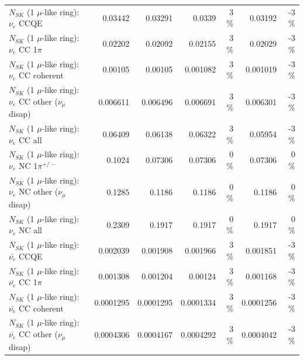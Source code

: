 \begin{table}
\begin{tabular}{| l | r | r | r  r | r  r |}
\hline
\hline
\hline
                                      $N_{SK}$ (1 $\mu$-like ring): $\nu_e$ CCQE &         0.03442 &         0.03291 &          0.0339 &        3 \%  &         0.03192 &       -3 \%  \\ 
                                 $N_{SK}$ (1 $\mu$-like ring): $\nu_e$ CC 1$\pi$ &         0.02202 &         0.02092 &         0.02155 &        3 \%  &         0.02029 &       -3 \%  \\ 
                               $N_{SK}$ (1 $\mu$-like ring): $\nu_e$ CC coherent &         0.00105 &         0.00105 &        0.001082 &        3 \%  &        0.001019 &       -3 \%  \\ 
                $N_{SK}$ (1 $\mu$-like ring): $\nu_e$ CC other ($\nu_\mu$ disap) &        0.006611 &        0.006496 &        0.006691 &        3 \%  &        0.006301 &       -3 \%  \\ 
                                  $N_{SK}$ (1 $\mu$-like ring): $\nu_{e}$ CC all &         0.06409 &         0.06138 &         0.06322 &        3 \%  &         0.05954 &       -3 \%  \\ 
\hline
                           $N_{SK}$ (1 $\mu$-like ring): $\nu_e$ NC 1$\pi^{+/-}$ &          0.1024 &         0.07306 &         0.07306 &        0 \%  &         0.07306 &        0 \%  \\ 
                $N_{SK}$ (1 $\mu$-like ring): $\nu_e$ NC other ($\nu_\mu$ disap) &          0.1285 &          0.1186 &          0.1186 &        0 \%  &          0.1186 &        0 \%  \\ 
                                  $N_{SK}$ (1 $\mu$-like ring): $\nu_{e}$ NC all &          0.2309 &          0.1917 &          0.1917 &        0 \%  &          0.1917 &        0 \%  \\ 
\hline
\hline
\hline
                                $N_{SK}$ (1 $\mu$-like ring): $\bar{\nu_e}$ CCQE &        0.002039 &        0.001908 &        0.001966 &        3 \%  &        0.001851 &       -3 \%  \\ 
                           $N_{SK}$ (1 $\mu$-like ring): $\bar{\nu_e}$ CC 1$\pi$ &        0.001308 &        0.001204 &         0.00124 &        3 \%  &        0.001168 &       -3 \%  \\ 
                         $N_{SK}$ (1 $\mu$-like ring): $\bar{\nu_e}$ CC coherent &       0.0001295 &       0.0001295 &       0.0001334 &        3 \%  &       0.0001256 &       -3 \%  \\ 
          $N_{SK}$ (1 $\mu$-like ring): $\bar{\nu_e}$ CC other ($\nu_\mu$ disap) &       0.0004306 &       0.0004167 &       0.0004292 &        3 \%  &       0.0004042 &       -3 \%  \\ 

\end{tabular}
\end{table}
